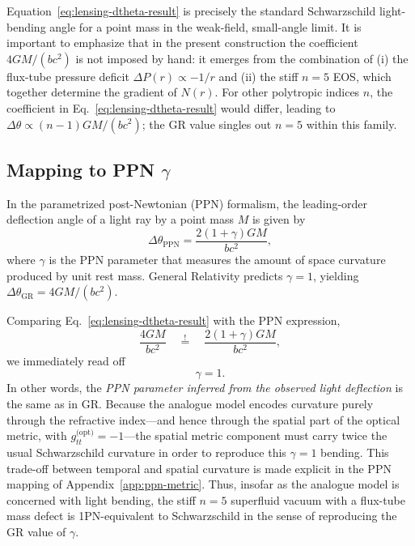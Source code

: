 \documentclass[11pt]{article}
\begin{document}
Equation~\eqref{eq:lensing-dtheta-result} is precisely the standard
Schwarzschild light-bending angle for a point mass in the weak-field,
small-angle limit.
It is important to emphasize that in the present construction the
coefficient $4GM/(b c^2)$ is not imposed by hand: it emerges from the
combination of (i) the flux-tube pressure deficit $\Delta P(r) \propto -1/r$
and (ii) the stiff $n=5$ EOS, which together determine the gradient of
$N(r)$.
For other polytropic indices $n$, the coefficient in
Eq.~\eqref{eq:lensing-dtheta-result} would differ, leading to
$\Delta\theta \propto (n-1)GM/(b c^2)$; the GR value singles out $n=5$
within this family.


\subsection{Mapping to PPN \texorpdfstring{$\gamma$}{gamma}}
\label{subsec:lensing-ppn}

In the parametrized post-Newtonian (PPN) formalism, the leading-order
deflection angle of a light ray by a point mass $M$ is given by
\begin{equation}
  \Delta\theta_{\text{PPN}}
  = \frac{2(1+\gamma)GM}{b c^2},
\end{equation}
where $\gamma$ is the PPN parameter that measures the amount of space
curvature produced by unit rest mass.
General Relativity predicts $\gamma = 1$, yielding
$\Delta\theta_{\text{GR}} = 4GM/(b c^2)$.

Comparing Eq.~\eqref{eq:lensing-dtheta-result} with the PPN expression,
\begin{equation}
  \frac{4GM}{b c^2}
  \quad\stackrel{!}{=}\quad
  \frac{2(1+\gamma)GM}{b c^2},
\end{equation}
we immediately read off
\begin{equation}
  \gamma = 1.
\end{equation}
In other words, the \emph{PPN parameter inferred from the observed light
deflection} is the same as in GR.
Because the analogue model encodes curvature purely through the refractive
index---and hence through the spatial part of the optical metric, with
$g_{tt}^{\text{(opt)}} = -1$---the spatial metric component must carry
twice the usual Schwarzschild curvature in order to reproduce this
$\gamma = 1$ bending.
This trade-off between temporal and spatial curvature is made explicit in
the PPN mapping of Appendix~\ref{app:ppn-metric}.
Thus, insofar as the analogue model is concerned with light bending, the
stiff $n=5$ superfluid vacuum with a flux-tube mass defect is 1PN-equivalent
to Schwarzschild in the sense of reproducing the GR value of $\gamma$.
\end{document}
